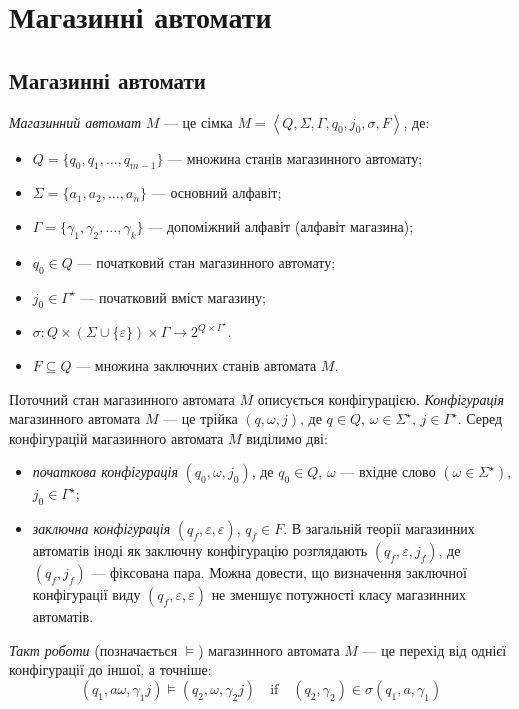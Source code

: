 \section{Магазинні автомати}

\subsection{Магазинні автомати}

\textit{Магазинний автомат} $M$ --- це сімка $M = \left\langle Q, \Sigma, \Gamma, q_0, j_0, \sigma, F \right\rangle$, де: 
\begin{itemize}
	\item $Q = \{q_0, q_1, \ldots, q_{m - 1}\}$ --- множина станів магазинного автомату;
	\item $\Sigma = \{a_1, a_2, \ldots, a_n\}$ --- основний алфавіт;
	\item $\Gamma = \{\gamma_1, \gamma_2, \ldots, \gamma_k\}$ --- допоміжний алфавіт (алфавіт
	магазина);
	\item $q_0 \in Q$ --- початковий стан магазинного автомату;
	\item $j_0 \in \Gamma^\star$ --- початковий вміст магазину;
	\item $\sigma: Q \times (\Sigma \cup \{\varepsilon\}) \times \Gamma \to 2^{Q \times 
	\Gamma^\star}$.
	\item $F \subseteq Q$ --- множина заключних станів автомата $M$.
\end{itemize}

Поточний стан магазинного автомата $M$ описується конфігурацією. \textit{Конфігурація} магазинного автомата $M$ --- це трійка $(q, \omega, j)$, де $q \in Q$, $\omega \in \Sigma^\star$, $j \in \Gamma^\star$. Серед конфігурацій магазинного автомата $M$ виділимо дві:
\begin{itemize}
	\item \textit{початкова конфігурація} $(q_0, \omega, j_0)$, де $q_0 \in Q$, $\omega$ --- вхідне слово $(\omega \in \Sigma^\star)$, $j_0 \in \Gamma^\star$;
	\item \textit{заключна конфігурація} $(q_f, \varepsilon, \varepsilon)$, $q_f \in F$. В загальній теорії магазинних автоматів іноді як заключну конфігурацію розглядають $(q_f, \varepsilon, j_f)$, де $(q_f, j_f)$ --- фіксована пара. Можна довести, що визначення заключної конфігурації виду $(q_f, \varepsilon, \varepsilon)$ не зменшує потужності класу магазинних автоматів.
\end{itemize}

\textit{Такт роботи} (позначається $\models$) магазинного автомата $M$ --- це перехід від однієї конфігурації до іншої, а точніше:
\[ (q_1, a \omega, \gamma_1 j) \models (q_2, \omega, \gamma_2 j) \quad\text{if}\quad (q_2, \gamma_2) \in \sigma(q_1, a, \gamma_1)\]

